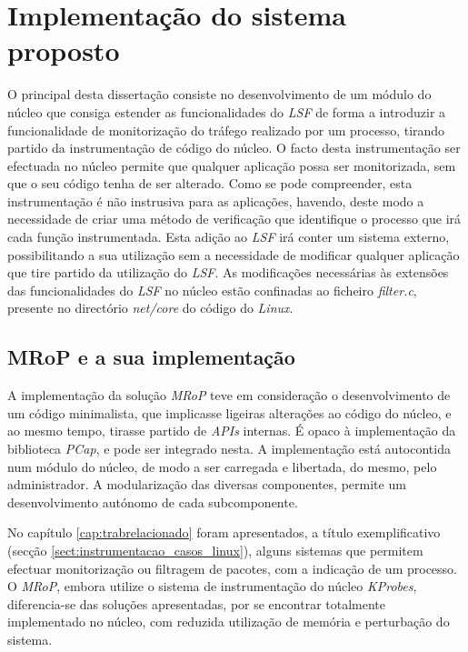 \chapter{Implementação do sistema proposto}
\label{cap:Implementacao}




O principal desta dissertação consiste no desenvolvimento de um módulo do núcleo que consiga estender as funcionalidades do \textit{LSF} de forma a introduzir a funcionalidade de monitorização do tráfego realizado por um processo, tirando partido da instrumentação de código do núcleo.
O facto desta instrumentação ser efectuada no núcleo permite que qualquer aplicação possa ser monitorizada, sem que o seu código tenha de ser alterado.
Como se pode compreender, esta instrumentação é não instrusiva para as aplicações, havendo, deste modo a necessidade de criar uma método de verificação que identifique o processo que irá cada função instrumentada.
Esta adição ao \textit{LSF} irá conter um sistema externo, possibilitando a sua utilização sem a necessidade de modificar qualquer aplicação que tire partido da utilização do \textit{LSF}.
As modificações necessárias às extensões das funcionalidades do \textit{LSF} no núcleo estão confinadas ao ficheiro \textit{filter.c}, presente no directório \textit{net/core} do código do \textit{Linux}.

\section{MRoP e a sua implementação}
\label{sec:mrop_implementation}

A implementação da solução \textit{MRoP} teve em consideração o desenvolvimento de um código minimalista, que implicasse ligeiras alterações ao código do núcleo, e ao mesmo tempo, tirasse partido de \textit{APIs} internas.
É opaco à implementação da biblioteca \textit{PCap}, e pode ser integrado nesta.
A implementação está autocontida num módulo do núcleo, de modo a ser carregada e libertada, do mesmo, pelo administrador.
A modularização das diversas componentes, permite um desenvolvimento autónomo de cada subcomponente.

No capítulo \ref{cap:trabrelacionado} foram apresentados, a título exemplificativo (secção \ref{sect:instrumentacao_casos_linux}), alguns sistemas que permitem efectuar monitorização ou filtragem de pacotes, com a indicação de um processo.
O \textit{MRoP}, embora utilize o sistema de instrumentação do núcleo \textit{KProbes}, diferencia-se das soluções apresentadas, por se encontrar totalmente implementado no núcleo, com reduzida utilização de memória e perturbação do sistema.

